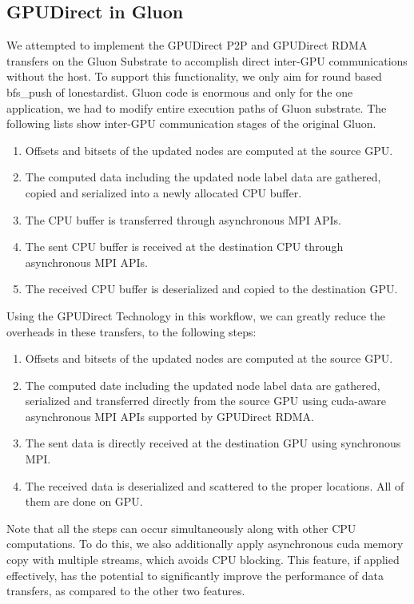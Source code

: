 \subsection{GPUDirect in Gluon}
We attempted to implement the GPUDirect P2P and GPUDirect RDMA transfers on the Gluon Substrate
to accomplish direct inter-GPU communications without the host.
To support this functionality, we only aim for round based bfs\_push of lonestardist.
Gluon code is enormous and only for the one application, we had to modify entire execution paths of Gluon substrate.
The following lists show inter-GPU communication stages of the original Gluon.
\begin{enumerate}
\item Offsets and bitsets of the updated nodes are computed at the source GPU.
\item The computed data including the updated node label data are gathered, copied and serialized into a newly allocated CPU buffer.
\item The CPU buffer is transferred through asynchronous MPI APIs.
\item The sent CPU buffer is received at the destination CPU through asynchronous MPI APIs.
\item The received CPU buffer is deserialized and copied to the destination GPU.
\end{enumerate}
Using the GPUDirect Technology in this workflow, we can greatly reduce the overheads in these transfers, to the following steps:
\begin{enumerate}
\item Offsets and bitsets of the updated nodes are computed at the source GPU.
\item The computed date including the updated node label data are gathered, serialized and transferred directly from the source GPU using cuda-aware asynchronous MPI APIs supported by GPUDirect RDMA.
\item The sent data is directly received at the destination GPU using synchronous MPI.
\item The received data is deserialized and scattered to the proper locations. All of them are done on GPU.
\end{enumerate}
Note that all the steps can occur simultaneously along with other CPU computations. 
To do this, we also additionally apply asynchronous cuda memory copy with multiple streams, which avoids CPU blocking.
This feature, if applied effectively, has the potential to significantly improve the performance of data transfers, as compared to the other two features.

